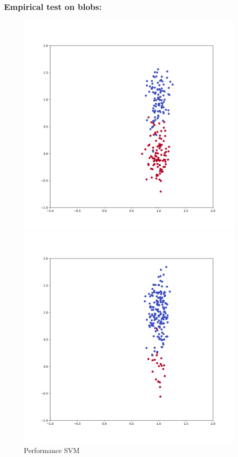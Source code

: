 \documentclass{beamer}
\begin{document}
\begin{frame}
    \frametitle{Empirical test on blobs:}
\begin{figure}[!h]
    \centering
    \begin{minipage}{.5\textwidth}
      \centering
      \includegraphics[width=\linewidth]{blobs-balanced}
    \end{minipage}%
    \begin{minipage}{.5\textwidth}
      \centering
      \includegraphics[width=\linewidth]{blobs-unbalanced}
    \end{minipage}
    \caption{Performance SVM}
  \end{figure}
\end{frame}
\end{document}
